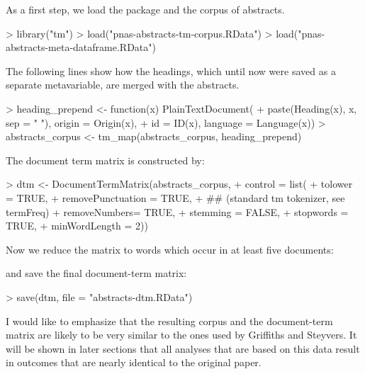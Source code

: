 

As a first step, we load the  package and the corpus of abstracts.
\begin{Schunk}
\begin{Sinput}
> library("tm")
> load("pnas-abstracts-tm-corpus.RData")
> load("pnas-abstracts-meta-dataframe.RData")
\end{Sinput}
\end{Schunk}

The following lines show how the headings, which until now were saved as a separate metavariable, are merged with the abstracts. 
\begin{Schunk}
\begin{Sinput}
> heading_prepend <- function(x) PlainTextDocument(
+    paste(Heading(x), x, sep = " "), origin = Origin(x), 
+    id = ID(x), language = Language(x))
> abstracts_corpus <- tm_map(abstracts_corpus, heading_prepend)
\end{Sinput}
\end{Schunk}
The document term matrix is constructed by:
\begin{Schunk}
\begin{Sinput}
> dtm <- DocumentTermMatrix(abstracts_corpus,
+    control = list(
+        tolower = TRUE,
+        removePunctuation = TRUE,
+        ## (standard tm tokenizer, see termFreq)
+        removeNumbers= TRUE, 
+        stemming = FALSE,
+        stopwords = TRUE,
+        minWordLength = 2))
\end{Sinput}
\end{Schunk}
Now we reduce the matrix to words which occur in at least five
documents:
\begin{Schunk}
\end{Schunk}
and save the final document-term matrix:
\begin{Schunk}
\begin{Sinput}
> save(dtm, file = "abstracts-dtm.RData")
\end{Sinput}
\end{Schunk}
I would like to emphasize that the resulting corpus and
the document-term matrix are likely to be very similar to the ones
used by Griffiths and Steyvers. It will be shown in later
sections that all analyses that are based on this data result in outcomes that are nearly identical to the original paper.



